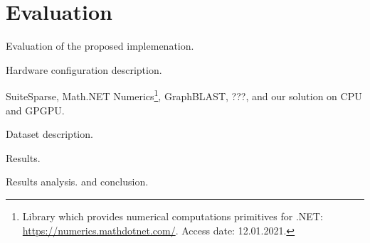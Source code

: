 \section{Evaluation}

Evaluation of the proposed implemenation.

Hardware configuration description.

SuiteSparse, Math.NET Numerics\footnote{Library which provides numerical computations primitives for .NET: \url{https://numerics.mathdotnet.com/}. Access date: 12.01.2021.}, GraphBLAST, ???, and our solution on CPU and GPGPU.

Dataset description.

Results.

Results analysis. and conclusion.

